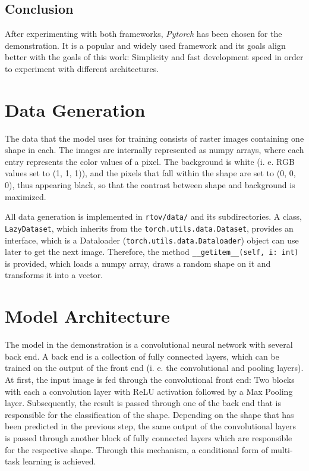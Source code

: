 \documentclass[12pt, a4paper, titlepage]{report}
\begin{document}
\subsection{Conclusion}

After experimenting with both frameworks, \emph{Pytorch} has been chosen for the demonstration. It is a popular and widely used framework and its goals align better with the goals of this work: Simplicity and fast development speed in order to experiment with different architectures.
\vspace{0.5cm}

\section{Data Generation}

The data that the model uses for training consists of raster images containing one shape in each. The images are internally represented as numpy arrays, where each entry represents the color values of a pixel. The background is white (i. e. RGB values set to (1, 1, 1)), and the pixels that fall within the shape are set to (0, 0, 0), thus appearing black, so that the contrast between shape and background is maximized.

All data generation is implemented in \lstinline{rtov/data/} and its subdirectories. A class, \lstinline{LazyDataset}, which inherits from the \lstinline{torch.utils.data.Dataset}, provides an interface, which is a Dataloader (\lstinline{torch.utils.data.Dataloader}) object can use later to get the next image. Therefore, the method \lstinline{__getitem__(self, i: int)} is provided, which loads a numpy array, draws a random shape on it and transforms it into a vector.

\section{Model Architecture}

The model in the demonstration is a convolutional neural network with several back end. A back end is a collection of fully connected layers, which can be trained on the output of the front end (i. e. the convolutional and pooling layers). At first, the input image is fed through the convolutional front end: Two blocks with each a convolution layer with ReLU activation followed by a Max Pooling layer. Subsequently, the result is passed through one of the back end that is responsible for the classification of the shape. Depending on the shape that has been predicted in the previous step, the same output of the convolutional layers is passed through another block of fully connected layers which are responsible for the respective shape. Through this mechanism, a conditional form of multi-task learning is achieved.
\end{document}
